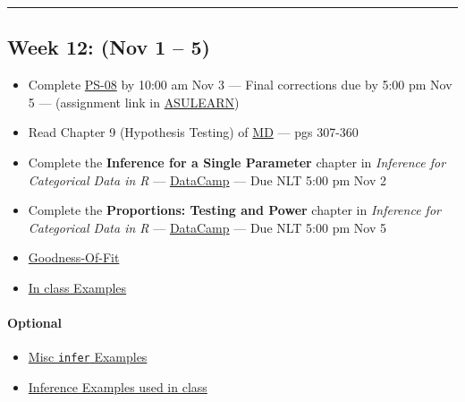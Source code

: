 \documentclass[
]{article}
\begin{document}
\begin{center}\rule{0.5\linewidth}{0.5pt}\end{center}

\hypertarget{week-12-nov-1-5}{%
\subsection*{Week 12: (Nov 1 -- 5)}\label{week-12-nov-1-5}}

\begin{itemize}
\item
  Complete
  \href{https://classroom.github.com/classrooms/87543903-stt3850-fall2021}{PS-08}
  by 10:00 am Nov 3 --- Final corrections due by 5:00 pm Nov 5 ---
  (assignment link in
  \href{https://asulearn.appstate.edu/course/view.php?id=131169}{ASULEARN})
\item
  Read Chapter 9 (Hypothesis Testing) of
  \href{https://moderndive.com}{MD} --- pgs 307-360
\item
  Complete the \textbf{Inference for a Single Parameter} chapter in
  \emph{Inference for Categorical Data in R} ---
  \href{https://app.datacamp.com/groups/stt3850-fall2021/assignments}{DataCamp}
  --- Due NLT 5:00 pm Nov 2
\item
  Complete the \textbf{Proportions: Testing and Power} chapter in
  \emph{Inference for Categorical Data in R} ---
  \href{https://app.datacamp.com/groups/stt3850-fall2021/assignments}{DataCamp}
  --- Due NLT 5:00 pm Nov 5
\item
  \href{../Handouts/ChiGOF.html}{Goodness-Of-Fit}
\item
  \href{../Rmarkdown/InClassNotes.html}{In class Examples}
\end{itemize}

\begin{rmdoptional}
\hypertarget{optional}{%
\paragraph*{Optional}\label{optional}}

\begin{itemize}
\item
  \href{../Rmarkdown/ExamplesInfer.html}{Misc \texttt{infer} Examples}
\item
  \href{../Handouts/InferenceExamples.pdf}{Inference Examples used in
  class}
\end{itemize}
\end{rmdoptional}
\end{document}
